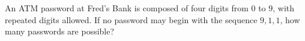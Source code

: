 An ATM password at Fred's Bank is composed of four digits from $0$ to $9$, with repeated digits allowed. If no password may begin with the sequence $9,1,1$, how many passwords are possible?
